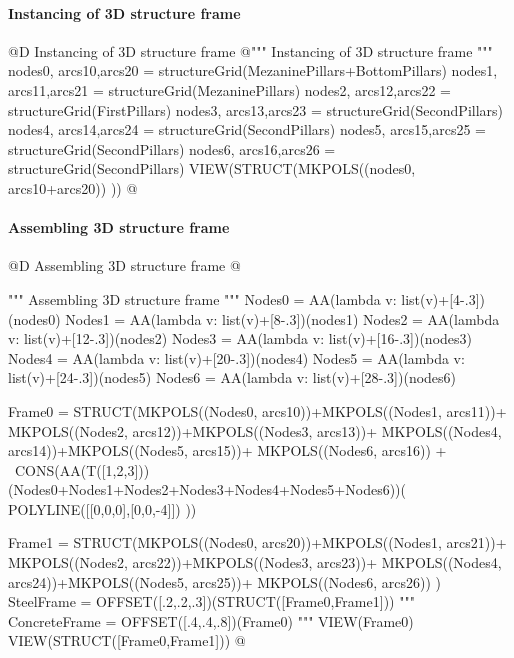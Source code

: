 \documentclass[11pt,oneside]{article}    %
\begin{document}
\paragraph{Instancing of 3D structure frame}
@D Instancing of 3D structure frame 
@{""" Instancing of 3D structure frame """
nodes0, arcs10,arcs20 = structureGrid(MezaninePillars+BottomPillars)
nodes1, arcs11,arcs21 = structureGrid(MezaninePillars)
nodes2, arcs12,arcs22 = structureGrid(FirstPillars)
nodes3, arcs13,arcs23 = structureGrid(SecondPillars)
nodes4, arcs14,arcs24 = structureGrid(SecondPillars)
nodes5, arcs15,arcs25 = structureGrid(SecondPillars)
nodes6, arcs16,arcs26 = structureGrid(SecondPillars)
VIEW(STRUCT(MKPOLS((nodes0, arcs10+arcs20)) ))
@}


\paragraph{Assembling 3D structure frame}
@D Assembling 3D structure frame 
@{""" Assembling 3D structure frame """
Nodes0 = AA(lambda v: list(v)+[4-.3])(nodes0)
Nodes1 = AA(lambda v: list(v)+[8-.3])(nodes1)
Nodes2 = AA(lambda v: list(v)+[12-.3])(nodes2)
Nodes3 = AA(lambda v: list(v)+[16-.3])(nodes3)
Nodes4 = AA(lambda v: list(v)+[20-.3])(nodes4)
Nodes5 = AA(lambda v: list(v)+[24-.3])(nodes5)
Nodes6 = AA(lambda v: list(v)+[28-.3])(nodes6)

Frame0 = STRUCT(MKPOLS((Nodes0, arcs10))+MKPOLS((Nodes1, arcs11))+
	MKPOLS((Nodes2, arcs12))+MKPOLS((Nodes3, arcs13))+
	MKPOLS((Nodes4, arcs14))+MKPOLS((Nodes5, arcs15))+
	MKPOLS((Nodes6, arcs16)) + \
	CONS(AA(T([1,2,3]))(Nodes0+Nodes1+Nodes2+Nodes3+Nodes4+Nodes5+Nodes6))(
	POLYLINE([[0,0,0],[0,0,-4]])  ))

Frame1 = STRUCT(MKPOLS((Nodes0, arcs20))+MKPOLS((Nodes1, arcs21))+
	MKPOLS((Nodes2, arcs22))+MKPOLS((Nodes3, arcs23))+
	MKPOLS((Nodes4, arcs24))+MKPOLS((Nodes5, arcs25))+
	MKPOLS((Nodes6, arcs26)) )
SteelFrame = OFFSET([.2,.2,.3])(STRUCT([Frame0,Frame1]))
"""
ConcreteFrame = OFFSET([.4,.4,.8])(Frame0)
"""
VIEW(Frame0)
VIEW(STRUCT([Frame0,Frame1]))
@}
\end{document}
